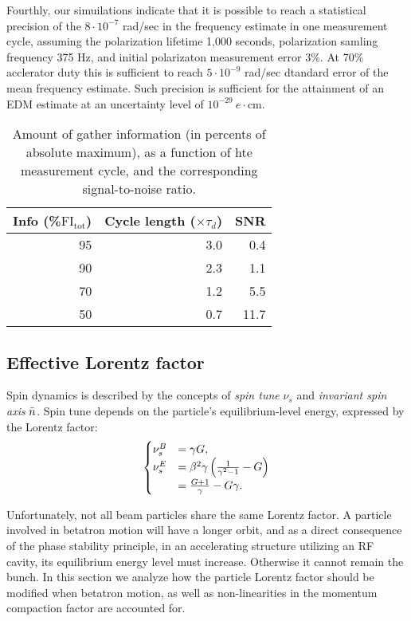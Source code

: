 Fourthly, our simuilations indicate that it is possible to reach a statistical precision of the 
$8\cdot 10^{-7}$ rad/sec in the frequency estimate in one measurement cycle, assuming the polarization
lifetime 1,000 seconds, polarization samling frequency 375 Hz, and initial polarizaton measurement error 3\%.
At 70\% acclerator duty this is sufficient to reach $5\cdot 10^{-9}$ rad/sec dtandard error of the mean
frequency estimate. Such precision is sufficient for the attainment of an EDM estimate
at an uncertainty level of $10^{-29}~e\cdot$cm.

\begin{table}[h]
	\caption{Amount of gather information (in percents of absolute maximum), as a function of hte measurement cycle, and the corresponding signal-to-noise ratio.\label{tbl:FItot}}
	
	\centering
	\begin{tabular}{rrr}
		\hline
		Info (\%$\mathrm{FI_{tot}}$) & Cycle length ($\times\tau_d$) & SNR  \\
		\hline
		95            & 3.0                     & 0.4         \\
		90            & 2.3                     & 1.1         \\
		70            & 1.2                     & 5.5         \\
		50            & 0.7                     & 11.7        \\
		\hline
	\end{tabular}
\end{table}


\subsection{Effective Lorentz factor}\label{chpt1:FS-methods:effective-Lorentz-factor}
Spin dynamics is described by the concepts of \emph{spin tune} $\nu_s$ and \emph{invariant spin axis} $\bar n$.
Spin tune depends on the particle's  equilibrium-level energy, expressed by the Lorentz factor:
\begin{equation}\label{eq:spin_tune_vs_gamma}
  \begin{cases}
    \nu_s^B &= \gamma G, \\
    \nu_s^E &= \beta^2\gamma\bkt{\frac{1}{\gamma^2-1} - G} \\
            &= \frac{G+1}{\gamma} - G\gamma.
  \end{cases}
\end{equation}

Unfortunately, not all beam particles share the same Lorentz factor. A particle involved in betatron
motion will have a longer orbit, and as a direct consequence of the phase stability principle,
in an accelerating structure utilizing an RF cavity, its equilibrium energy level 
must increase. Otherwise it cannot remain the bunch. In this section we analyze how the particle Lorentz factor
should be modified when betatron motion, as well as non-linearities in the momentum compaction factor are
accounted for.

